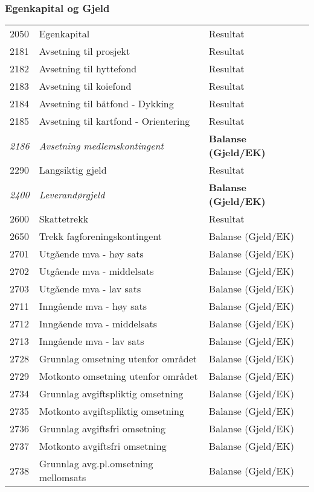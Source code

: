 \subsubsection*{Egenkapital og Gjeld}
\begin{table}[H]
	\begin{tabular}{l l l }
2050 & Egenkapital & Resultat\\
2181 & Avsetning til prosjekt & Resultat\\
2182 & Avsetning til hyttefond & Resultat\\
2183 & Avsetning til koiefond & Resultat\\
2184 & Avsetning til båtfond - Dykking & Resultat\\
2185 & Avsetning til kartfond - Orientering & Resultat\\
\emph{2186} & \emph{Avsetning medlemskontingent} & {\bfseries Balanse (Gjeld/EK)}\\
2290 & Langsiktig gjeld & Resultat\\
\emph{2400} & \emph{Leverandørgjeld} & {\bfseries Balanse (Gjeld/EK)}\\
2600 & Skattetrekk & Resultat\\
2650 & Trekk fagforeningskontingent & Balanse (Gjeld/EK)\\
2701 & Utgående mva - høy sats & Balanse (Gjeld/EK)\\
2702 & Utgående mva - middelsats & Balanse (Gjeld/EK)\\
2703 & Utgående mva - lav sats & Balanse (Gjeld/EK)\\
2711 & Inngående mva - høy sats & Balanse (Gjeld/EK)\\
2712 & Inngående mva - middelsats & Balanse (Gjeld/EK)\\
2713 & Inngående mva - lav sats & Balanse (Gjeld/EK)\\
2728 & Grunnlag omsetning utenfor området & Balanse (Gjeld/EK)\\
2729 & Motkonto omsetning utenfor området & Balanse (Gjeld/EK)\\
2734 & Grunnlag avgiftspliktig omsetning & Balanse (Gjeld/EK)\\
2735 & Motkonto avgiftspliktig omsetning & Balanse (Gjeld/EK)\\
2736 & Grunnlag avgiftsfri omsetning & Balanse (Gjeld/EK)\\
2737 & Motkonto avgiftsfri omsetning & Balanse (Gjeld/EK)\\
2738 & Grunnlag avg.pl.omsetning mellomsats & Balanse (Gjeld/EK)\\

\end{tabular}
\end{table}
